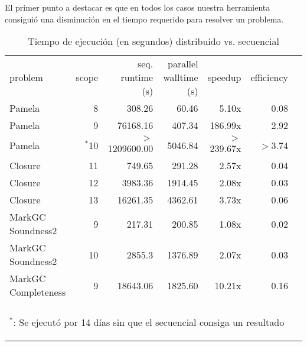 El primer punto a destacar es que en todos los casos
nuestra herramienta consiguió una disminución en el tiempo requerido para
resolver un problema. 

\hspace{-5em}
\begin{table}
	\footnotesize
	\begin{tabular}{lrrrrrr}
		\toprule
		problem	&	scope	&	seq. runtime (s)	&	parallel walltime (s)	&	speedup	&	efficiency \\
		\cmidrule(r){1-6}
		Pamela	&	8	&	308.26	&	60.46	&	5.10x	&	0.08 \\
		Pamela	&	9	&	76168.16	&	407.34	&	186.99x	&	2.92 \\
		Pamela	&	$^*$10	&	$>$1209600.00	&	5046.84	&	$>$239.67x	&	$>$3.74 \\
		\cmidrule(r){1-6}
		Closure	&	11	&	749.65	&	291.28	&	2.57x	&	0.04 \\
		Closure	&	12	&	3983.36	&	1914.45	&	2.08x	&	0.03 \\
		Closure	&	13	&	16261.35	&	4362.61	&	3.73x	&	0.06 \\
		\cmidrule(r){1-6}
		MarkGC Soundness2	&	9	&	217.31	&	200.85	&	1.08x	&	0.02 \\
		MarkGC Soundness2	&	10	&	2855.3	&	1376.89	&	2.07x	&	0.03 \\
		\cmidrule(r){1-6}
		MarkGC Completeness	&	9	&	18643.06	&	1825.60	&	10.21x	&	0.16 \\
		\bottomrule
		\\
		\multicolumn{6}{l}{\begin{tiny}$^*$: Se ejecutó por 14 días sin que el \ssolver secuencial consiga un resultado\end{tiny}}
	\end{tabular}
	\caption{Tiempo de ejecución (en segundos) distribuido vs. secuencial}
	\label{tab:resultados}
\end{table}

